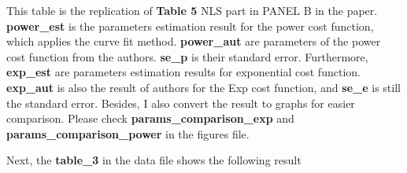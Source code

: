 \documentclass[11pt
]{article}
\begin{document}
This table is the replication of \textbf{Table 5} NLS part in PANEL B
in the paper. \textbf{power\_est} is the parameters estimation result for
the power cost function, which applies the curve fit method. \textbf{power\_aut}
are parameters of the power cost function from the authors. \textbf{se\_p}
is their standard error. Furthermore, \textbf{exp\_est} are parameters
estimation results for exponential cost function. \textbf{exp\_aut} is
also the result of authors for the Exp cost function, and \textbf{se\_e} is
still the standard error. Besides, I also convert the result to 
graphs for easier comparison. Please check
\textbf{params\_comparison\_exp} and \textbf{params\_comparison\_power}
in the figures file.

Next, the \textbf{table\_3} in the data file shows the following result
\end{document}
